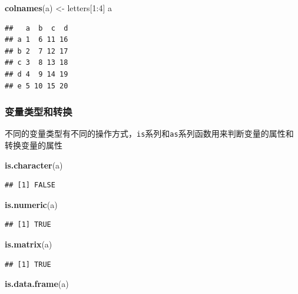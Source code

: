 \documentclass[]{article}
\newenvironment{Shaded}{\begin{snugshade}}{\end{snugshade}}
\newcommand{\KeywordTok}[1]{\textcolor[rgb]{0.13,0.29,0.53}{\textbf{{#1}}}}
\newcommand{\DecValTok}[1]{\textcolor[rgb]{0.00,0.00,0.81}{{#1}}}
\newcommand{\StringTok}[1]{\textcolor[rgb]{0.31,0.60,0.02}{{#1}}}
\newcommand{\NormalTok}[1]{{#1}}
\numberwithin{figure}{section}
\numberwithin{table}{section}
\theoremstyle{definition}
\theoremstyle{definition}
\theoremstyle{definition}
\theoremstyle{remark}
\begin{document}
\begin{Shaded}
\begin{Highlighting}[]
\KeywordTok{colnames}\NormalTok{(a) <-}\StringTok{ }\NormalTok{letters[}\DecValTok{1}\NormalTok{:}\DecValTok{4}\NormalTok{]}
\NormalTok{a}
\end{Highlighting}
\end{Shaded}

\begin{verbatim}
##   a  b  c  d
## a 1  6 11 16
## b 2  7 12 17
## c 3  8 13 18
## d 4  9 14 19
## e 5 10 15 20
\end{verbatim}

\subsubsection{变量类型和转换}

不同的变量类型有不同的操作方式，\texttt{is}系列和\texttt{as}系列函数用来判断变量的属性和转换变量的属性

\begin{Shaded}
\begin{Highlighting}[]
\KeywordTok{is.character}\NormalTok{(a)}
\end{Highlighting}
\end{Shaded}

\begin{verbatim}
## [1] FALSE
\end{verbatim}

\begin{Shaded}
\begin{Highlighting}[]
\KeywordTok{is.numeric}\NormalTok{(a)}
\end{Highlighting}
\end{Shaded}

\begin{verbatim}
## [1] TRUE
\end{verbatim}

\begin{Shaded}
\begin{Highlighting}[]
\KeywordTok{is.matrix}\NormalTok{(a)}
\end{Highlighting}
\end{Shaded}

\begin{verbatim}
## [1] TRUE
\end{verbatim}

\begin{Shaded}
\begin{Highlighting}[]
\KeywordTok{is.data.frame}\NormalTok{(a)}
\end{Highlighting}
\end{Shaded}
\end{document}
